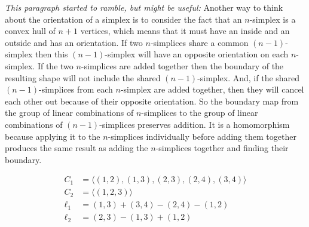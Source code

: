 \textit{This paragraph started to ramble, but might be useful:}
Another way to think about the orientation of a simplex is to consider the fact that an \(n\)-simplex is a convex hull of \(n+1\) vertices, which means that it must have an inside and an outside and has an orientation.
If two \(n\)-simplices share a common \((n-1)\)-simplex then this \((n-1)\)-simplex will have an opposite orientation on each \(n\)-simplex.
If the two \(n\)-simplices are added together then the boundary of the resulting shape will not include the shared \((n-1)\)-simplex.
And, if the shared \((n-1)\)-simplices from each \(n\)-simplex are added together, then they will cancel each other out because of their opposite orientation.
So the boundary map from the group of linear combinations of \(n\)-simplices to the group of linear combinations of \((n-1)\)-simplices preserves addition.
It is a homomorphism because applying it to the \(n\)-simplices individually before adding them together produces the same result as adding the \(n\)-simplices together and finding their boundary.

\begin{figure}
    \centering
    \begin{minipage}{.5\textwidth}
        \centering
        
    \end{minipage}%
    \begin{minipage}{.5\textwidth}
        \begin{align*}
            C_1 &= \langle (1,2),(1,3),(2,3),(2,4),(3,4) \rangle \\
            C_2 &= \langle (1,2,3) \rangle \\
            \ell_1 &= (1,3) + (3,4) - (2,4) - (1,2)\\
            \ell_2 &= (2,3) - (1,3) + (1,2)
        \end{align*}
    \end{minipage}
    \caption{}
    \label{fig:example-cech}
\end{figure}




